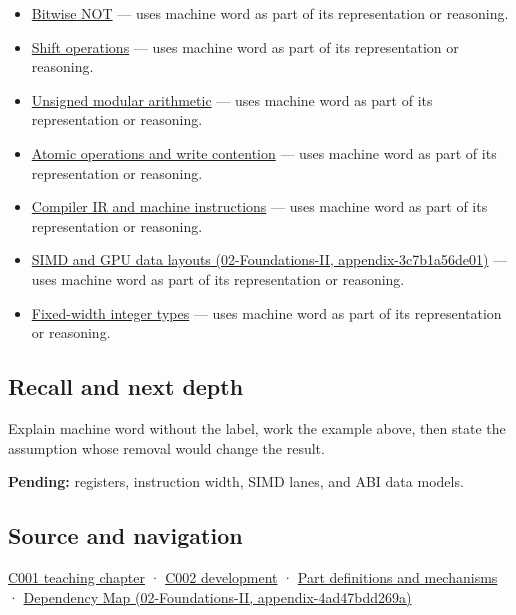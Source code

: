 \begin{itemize}
\tightlist
\item
  \hyperref[appendix-8f38927cfc54]{Bitwise NOT} --- uses machine word as part of its representation or reasoning.
\item
  \hyperref[appendix-73425b25118e]{Shift operations} --- uses machine word as part of its representation or reasoning.
\item
  \hyperref[appendix-c99977d88b33]{Unsigned modular arithmetic} --- uses machine word as part of its representation or reasoning.
\item
  \hyperref[appendix-e12d1b03fefb]{Atomic operations and write contention} --- uses machine word as part of its representation or reasoning.
\item
  \hyperref[appendix-942ad41afb30]{Compiler IR and machine instructions} --- uses machine word as part of its representation or reasoning.
\item
  \href{}{SIMD and GPU data layouts (02-Foundations-II, appendix-3c7b1a56de01)} --- uses machine word as part of its representation or reasoning.
\item
  \hyperref[appendix-cc04044b5782]{Fixed-width integer types} --- uses machine word as part of its representation or reasoning.
\end{itemize}

\subsection{Recall and next depth}\label{recall-and-next-depth}

Explain machine word without the label, work the example above, then state the assumption whose removal would change the result.

\textbf{Pending:} registers, instruction width, SIMD lanes, and ABI data models.

\subsection{Source and navigation}\label{source-and-navigation}

\href{Continuous\%20Notes/Computing\%20Foundations\%20-\%20From\%20Bits\%20to\%20C++\%20and\%20Systems\%20APIs\#From\%20a\%20signal\%20to\%20an\%20interpretation}{C001 teaching chapter} · \href{Continuous\%20Notes/Computing\%20Foundations\%20-\%20From\%20Bits\%20to\%20C++\%20and\%20Systems\%20APIs\#Arithmetic\%20becomes\%20a\%20policy}{C002 development} · \hyperref[appendix-fd090d982a15]{Part definitions and mechanisms} · \href{}{Dependency Map (02-Foundations-II, appendix-4ad47bdd269a)}
